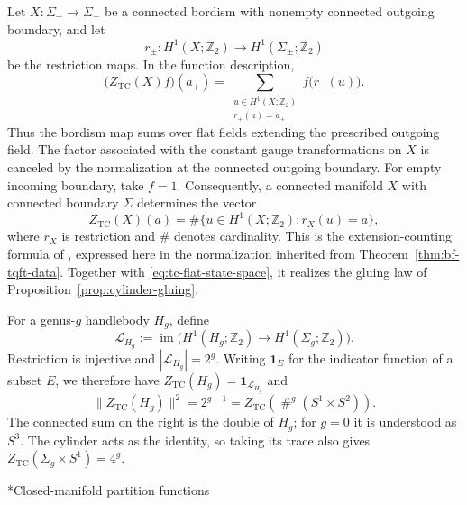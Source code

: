 \documentclass[12pt]{amsart}
\makeatletter
\renewcommand\subsection{\@startsection{subsection}{2}%
  \z@{.5\linespacing\@plus.7\linespacing}{-.5em}%
  {\normalfont\bfseries}}
\numberwithin{equation}{section}
\theoremstyle{definition}
\makeatother
\begin{document}
Let $X:\Sigma_-\to\Sigma_+$ be a connected bordism with nonempty
connected outgoing boundary, and let
$$
r_\pm:
H^1(X;\mathbb Z_2)
\longrightarrow
H^1(\Sigma_\pm;\mathbb Z_2)
$$
be the restriction maps. In the function description,
\begin{equation}
\label{eq:tc-bordism-map}
\bigl(Z_{\mathrm{TC}}(X)f\bigr)(a_+)
=
\sum_{\substack{
u\in H^1(X;\mathbb Z_2)\\
r_+(u)=a_+
}}
f\bigl(r_-(u)\bigr).
\end{equation}
Thus the bordism map sums over flat fields extending the prescribed outgoing field. The factor associated with the constant gauge transformations on $X$ is canceled by the normalization at the connected outgoing boundary. For empty incoming boundary, take $f=1$. Consequently, a connected manifold $X$ with connected boundary $\Sigma$ determines the vector
\begin{equation}
\label{eq:tc-bordism-state}
Z_{\mathrm{TC}}(X)(a)
=
\#\{u\in H^1(X;\mathbb Z_2):r_X(u)=a\},
\end{equation}
where $r_X$ is restriction and $\#$ denotes cardinality.
This is the extension-counting formula of
\cite[Section~5]{Freed:1991}, expressed here in the
normalization inherited from Theorem~\ref{thm:bf-tqft-data}.
Together with \eqref{eq:tc-flat-state-space}, it realizes the gluing
law of Proposition~\ref{prop:cylinder-gluing}.

For a genus-$g$ handlebody $H_g$, define
$$
\mathcal L_{H_g}
:=
\operatorname{im}\bigl(
H^1(H_g;\mathbb Z_2)
\longrightarrow H^1(\Sigma_g;\mathbb Z_2)
\bigr).
$$
Restriction is injective and $|\mathcal L_{H_g}|=2^g$.
Writing $\mathbf1_E$ for the indicator function of a subset $E$,
we therefore have
$Z_{\mathrm{TC}}(H_g)=\mathbf1_{\mathcal L_{H_g}}$ and
\begin{equation}
\label{eq:tc-handlebody-gluing}
\|Z_{\mathrm{TC}}(H_g)\|^2
=
2^{g-1}
=
Z_{\mathrm{TC}}\!\left(
\mathop{\#}^{g}(S^1\times S^2)
\right).
\end{equation}
The connected sum on the right is the double of $H_g$; for $g=0$
it is understood as $S^3$. The cylinder acts as the identity, so
taking its trace also gives
$Z_{\mathrm{TC}}(\Sigma_g\times S^1)=4^g$.

\subsection*{Closed-manifold partition functions}
\end{document}
